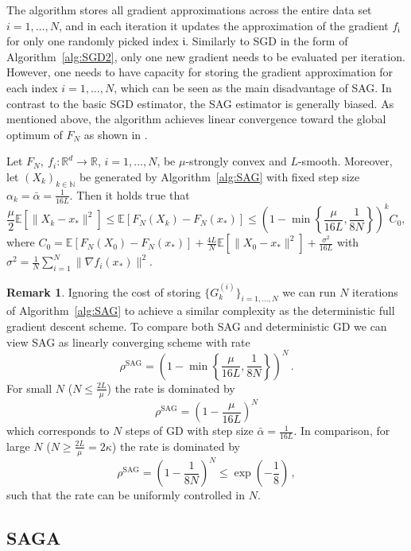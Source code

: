 \documentclass[12pt,openany]{book}
\theoremstyle{definition}
\newtheorem{remark}[thm]{Remark}
\theoremstyle{definition}
\newcommand{\E}{\mathbb{E}}
\newcommand{\N}{\mathbb{N}}
\newcommand{\R}{\mathbb{R}}
\begin{document}
The algorithm stores all gradient approximations across the entire data set $i=1,\dots,N$, and in each iteration it updates the approximation of the gradient $f_{\mathfrak i}$ for only one randomly picked index $\mathfrak i$. Similarly to SGD in the form of Algorithm~\ref{alg:SGD2}, only one new gradient needs to be evaluated per iteration. However, one needs to have capacity for storing the gradient approximation for each index $i=1,\dots,N$, which can be seen as the main disadvantage of SAG. In contrast to the basic SGD estimator, the SAG estimator is generally biased. As mentioned above, the algorithm achieves linear convergence toward the global optimum of $F_N$ as shown in \cite{Schmidt2017}.

\begin{thm}
Let $F_N,\ f_i:\R^d\to\R$, $i=1,\dots,N$, be $\mu$-strongly convex and $L$-smooth. Moreover, let $(X_k)_{k\in\N}$ be generated by Algorithm~\ref{alg:SAG} with fixed step size $\alpha_k = \bar\alpha = \frac{1}{16L}$. Then it holds true that
\[\frac\mu2\E[\|X_k-x_\ast\|^2]\le \E[F_N(X_k)-F_N(x_\ast)] \le \left(1-\min\left\{\frac{\mu}{16L},\frac{1}{8N}\right\}\right)^k C_0, \]
where $C_0 = \E[F_N(X_0)-F_N(x_\ast)] + \frac{4L}{N} \E[\|X_0-x_\ast\|^2] + \frac{\sigma^2}{16L}$ with $\sigma^2 = \frac1N\sum_{i=1}^N \|\nabla f_i(x_\ast)\|^2$. 
\end{thm}

\begin{remark}
Ignoring the cost of storing $\{G_k^{(i)}\}_{i=1,\dots,N}$ we can run $N$ iterations of Algorithm~\ref{alg:SAG} to achieve a similar complexity as the deterministic full gradient descent scheme. To compare both SAG and deterministic GD we can view SAG as linearly converging scheme with rate \[\rho^{\mathrm{SAG}}=\left(1-\min\left\{\frac{\mu}{16L},\frac{1}{8N}\right\}\right)^N\,.\] For small $N$ ($N\le \frac{2L}{\mu}$) the rate is dominated by 
\[\rho^{\mathrm{SAG}}=\left(1-\frac{\mu}{16L}\right)^N\]
which corresponds to $N$ steps of GD with step size $\bar\alpha=\frac{1}{16L}$. In comparison, for large $N$ ($N\ge\frac{2L}{\mu} = 2\kappa$) the rate is dominated by
\[\rho^{\mathrm{SAG}}=\left(1-\frac{1}{8N}\right)^N\le \exp(-\frac18)\,,\]
such that the rate can be uniformly controlled in $N$.
\end{remark}


\subsection{SAGA}
\end{document}

